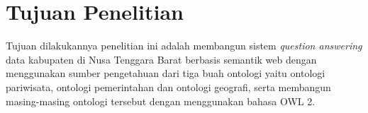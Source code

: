 \section{Tujuan Penelitian}
Tujuan dilakukannya penelitian ini adalah membangun sistem \textit{question answering} data kabupaten di Nusa Tenggara Barat berbasis semantik web dengan menggunakan sumber pengetahuan dari tiga buah ontologi yaitu ontologi pariwisata, ontologi pemerintahan dan ontologi geografi, serta membangun masing-masing ontologi tersebut dengan menggunakan bahasa OWL 2.